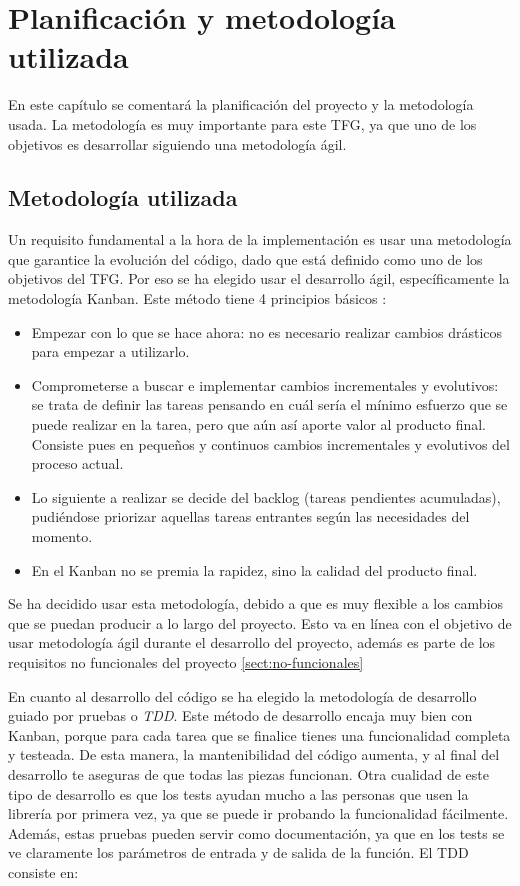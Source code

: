 \chapter{Planificación y metodología utilizada}

En este capítulo se comentará la planificación del proyecto y la metodología usada. La metodología
es muy importante para este TFG, ya que uno de los objetivos es desarrollar siguiendo una metodología
ágil.

\section{Metodología utilizada}

Un requisito fundamental a la hora de la implementación es usar una metodología que garantice la evolución del código,
dado que está definido como uno de los objetivos del TFG. Por eso se ha elegido usar el desarrollo ágil, específicamente 
la metodología Kanban. Este método tiene 4 principios básicos \cite{kanban}:

\begin{itemize}
    \item Empezar con lo que se hace ahora: no es necesario realizar cambios drásticos para empezar a utilizarlo.
    \item Comprometerse a buscar e implementar cambios incrementales y evolutivos: se trata de definir las tareas
    pensando en cuál sería el mínimo esfuerzo que se puede realizar en la tarea, pero que aún así aporte valor al producto final.
    Consiste pues en pequeños y continuos cambios incrementales y evolutivos del proceso actual.
    \item Lo siguiente a realizar se decide del backlog (tareas pendientes acumuladas), pudiéndose priorizar aquellas 
    tareas entrantes según las necesidades del momento.
    \item  En el Kanban no se premia la rapidez, sino la calidad del producto final.
\end{itemize}

Se ha decidido usar esta metodología, debido a que es muy flexible a los cambios que se puedan producir a lo largo del proyecto. Esto va en
línea con el objetivo de usar metodología ágil durante el desarrollo del proyecto, además es parte de los requisitos no funcionales del proyecto \ref{sect:no-funcionales}

En cuanto al desarrollo del código se ha elegido la metodología de desarrollo guiado por pruebas o \emph{TDD}. Este método
de desarrollo encaja muy bien con Kanban, porque para cada tarea que se finalice tienes una funcionalidad completa y testeada. De esta manera, la mantenibilidad del código aumenta, y al final del desarrollo te aseguras de que todas las piezas funcionan. Otra cualidad de
este tipo de desarrollo es que los tests ayudan mucho a las personas que usen la librería por primera vez, ya que se puede 
ir probando la funcionalidad fácilmente. Además, estas pruebas pueden servir como documentación, ya que en los tests se ve claramente 
los parámetros de entrada y de salida de la función. El TDD consiste en:

